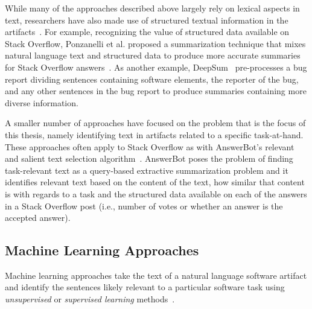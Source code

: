 

While many of the approaches described above
largely rely on  lexical aspects in text, researchers have also made
use
of structured textual information in the artifacts~\cite{Ponzanelli2015, Treude2016, chen2016}. 
For example, recognizing the value of structured data available on Stack Overflow, Ponzanelli et al. 
proposed a summarization technique that mixes natural language text and structured data to produce more accurate summaries for Stack Overflow answers~\cite{Ponzanelli2015}. 
As another example, DeepSum~\cite{Li2018} pre-processes a bug report dividing sentences containing software elements, the reporter of the bug, and any other sentences in the bug report to produce summaries containing more diverse information.




A smaller number of approaches have focused
on the problem that is the focus of this
thesis, namely identifying text in artifacts
related to a specific task-at-hand.
These approaches often apply to Stack Overflow 
as with AnswerBot's relevant and salient text selection algorithm~\cite{Xu2017}. AnswerBot poses the problem of finding task-relevant text 
as a query-based extractive summarization problem and it identifies relevant text based on 
the content of the text, how similar that content is with regards to a task and the structured data available on each of the answers in a Stack Overflow post (i.e., number of votes or whether an answer is the accepted answer).


\subsection{Machine Learning Approaches}


Machine learning approaches take the text of a natural language software artifact and identify 
the sentences likely relevant to a particular software task using \textit{unsupervised} or 
\textit{supervised learning} methods~\cite{zhang2005machine}.



